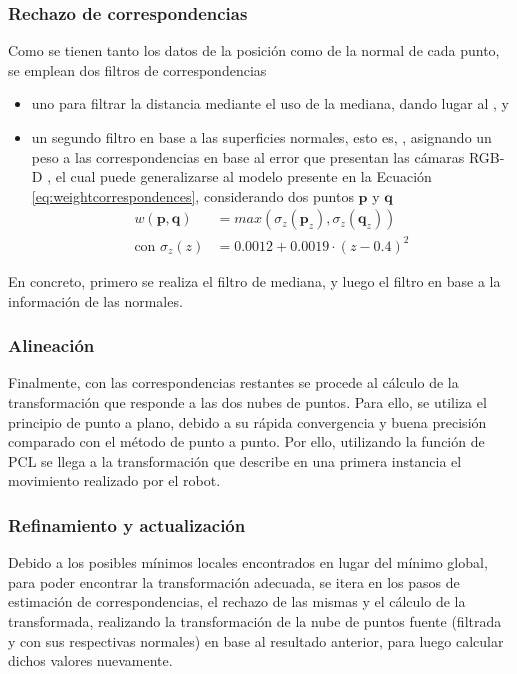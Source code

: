 \subsubsection{Rechazo de correspondencias}
Como se tienen tanto los datos de la posición como de la normal de cada punto, se emplean dos filtros de correspondencias
\begin{itemize}
    \item uno para filtrar la distancia mediante el uso de la mediana, dando lugar al , y
    \item  un segundo filtro en base a las superficies normales, esto es, , asignando un peso a las correspondencias en base al error que presentan las cámaras RGB-D \cite{nguyen2012}, el cual puede generalizarse al modelo presente en la Ecuación \ref{eq:weightcorrespondences}, considerando dos puntos $\bm{p}$ y $\bm{q}$
    \begin{align}
        w(\bm{p},\bm{q}) &= max(\sigma_z({\bm{p}_z}), \sigma_z(\bm{q}_z))
        \label{eq:weightcorrespondences} \\
        \text{con }\sigma_z(z) &= 0.0012+0.0019\cdot (z-0.4)^2
    \end{align}
\end{itemize}

En concreto, primero se realiza el filtro de mediana, y luego el filtro en base a la información de las normales.

\subsubsection{Alineación}
Finalmente, con las correspondencias restantes se procede al cálculo de la transformación que responde a las dos nubes de puntos. Para ello, se utiliza el principio de punto a plano, debido a su rápida convergencia y buena precisión comparado con el método de punto a punto. Por ello, utilizando la función de PCL  se llega a la transformación que describe en una primera instancia el movimiento realizado por el robot.

\subsubsection{Refinamiento y actualización}
Debido a los posibles mínimos locales encontrados en lugar del mínimo global, para poder encontrar la transformación adecuada, se itera en los pasos de estimación de correspondencias, el rechazo de las mismas y el cálculo de la transformada, realizando la transformación de la nube de puntos fuente (filtrada y con sus respectivas normales) en base al resultado anterior, para luego calcular dichos valores nuevamente.

